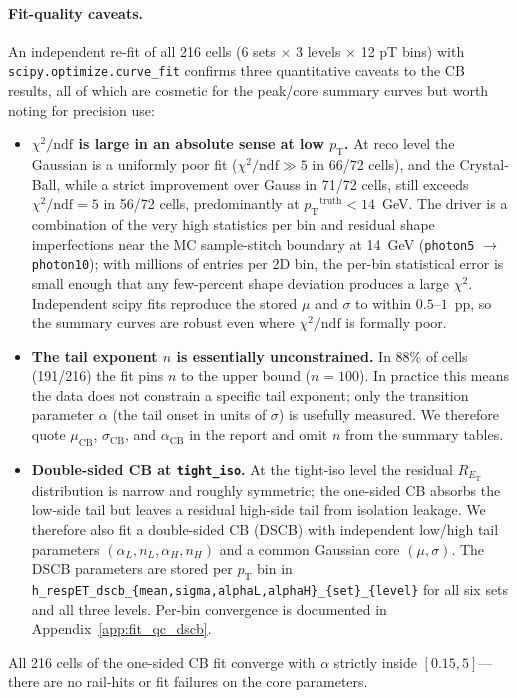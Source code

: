 \documentclass[11pt,letterpaper]{article}
\newcommand{\pT}{\ensuremath{p_{\text{T}}}}
\newcommand{\ET}{\ensuremath{E_{\text{T}}}}
\begin{document}
\paragraph{Fit-quality caveats.}
An independent re-fit of all 216 cells (6 sets $\times$ 3 levels
$\times$ 12 pT bins) with \texttt{scipy.optimize.curve\_fit} confirms
three quantitative caveats to the CB results, all of which are
cosmetic for the peak/core summary curves but worth noting for
precision use:
\begin{itemize}
  \item \textbf{$\chi^2/\mathrm{ndf}$ is large in an absolute sense at
    low \pT.} At reco level the Gaussian is a uniformly poor fit
    ($\chi^2/\mathrm{ndf} \gg 5$ in 66/72 cells), and the Crystal-Ball,
    while a strict improvement over Gauss in 71/72 cells, still exceeds
    $\chi^2/\mathrm{ndf} = 5$ in 56/72 cells, predominantly at
    $\pT^{\text{truth}} < 14$~GeV. The driver is a combination of the
    very high statistics per bin and residual shape imperfections near
    the MC sample-stitch boundary at 14~GeV (\texttt{photon5}
    $\to$ \texttt{photon10}); with millions of entries per 2D bin, the
    per-bin statistical error is small enough that any few-percent
    shape deviation produces a large $\chi^2$. Independent scipy fits
    reproduce the stored $\mu$ and $\sigma$ to within $0.5$--$1$~pp, so
    the summary curves are robust even where $\chi^2/\mathrm{ndf}$ is
    formally poor.
  \item \textbf{The tail exponent $n$ is essentially unconstrained.}
    In 88\% of cells (191/216) the fit pins $n$ to the upper bound
    ($n = 100$). In practice this means the data does not constrain a
    specific tail exponent; only the transition parameter $\alpha$
    (the tail onset in units of $\sigma$) is usefully measured. We
    therefore quote $\mu_{\text{CB}}$, $\sigma_{\text{CB}}$, and
    $\alpha_{\text{CB}}$ in the report and omit $n$ from the summary
    tables.
  \item \textbf{Double-sided CB at \texttt{tight\_iso}.} At the
    tight-iso level the residual $R_{\ET}$ distribution is narrow and
    roughly symmetric; the one-sided CB absorbs the low-side tail but
    leaves a residual high-side tail from isolation leakage. We
    therefore also fit a double-sided CB (DSCB) with independent
    low/high tail parameters $(\alpha_L, n_L, \alpha_H, n_H)$ and a
    common Gaussian core $(\mu, \sigma)$. The DSCB parameters are
    stored per \pT{} bin in
    \texttt{h\_respET\_dscb\_\{mean,sigma,alphaL,alphaH\}\_\{set\}\_\{level\}}
    for all six sets and all three levels. Per-bin convergence is
    documented in Appendix~\ref{app:fit_qc_dscb}.
\end{itemize}
All 216 cells of the one-sided CB fit converge with $\alpha$ strictly
inside $[0.15, 5]$---there are no rail-hits or fit failures on the core
parameters.
\end{document}
